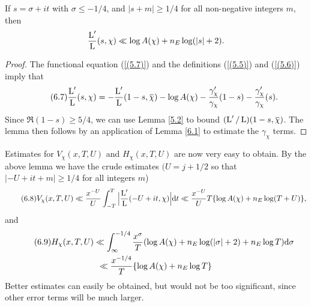 \documentclass[./main]{subfiles}
\begin{document}
\begin{lemma} \label{6.2}
If $s = \sigma + it$ with $\sigma \leq -1/4$, and $|s+m| \geq 1/4$ for all non-negative integers $m$, then 
\[\frac{\operatorname{L}'}{\operatorname{L}}(s, \chi) \ll \log A(\chi) + n_E \log(|s| + 2).
\]
\end{lemma}
\begin{proof}
The functional equation (\ref{(5.7)}) and the definitions (\ref{(5.5)}) and (\ref{(5.6)}) imply that
\[\tag{6.7}\label{(6.7)}\frac{\L'}{\L}(s, \chi) = -\frac{\L'}{\L}(1-s, \xoverline{\chi}) - \log A(\chi) - \frac{\gamma'_{\chi}}{\gamma_{\chi}} (1-s) - \frac{\gamma'_{\chi}}{\gamma_{\chi}}(s).
\]
Since $\Re(1-s) \geq 5/4$, we can use Lemma \ref{5.2} to bound $(\L'/\L)(1-s, \xoverline{\chi})$. The lemma then follows by an application of Lemma \ref{6.1} to estimate the $\gamma_{\chi}$ terms.
\end{proof}
Estimates for $V_{\chi}(x,T,U)$ and $H_{\chi}(x,T,U)$ are now very easy to obtain. By the above lemma we have the crude estimates $(U = j + 1/2$ so that $|-U + it+m| \geq 1/4$ for all integers $m$)
\[\tag{6.8}\label{(6.8)}  V_{\chi}(x,T,U) \ll \frac{x^{-U}}{U} \int_{-T}^{T} \Big| \frac{\operatorname{L}'}{\operatorname{L}}(-U+it, \chi) \Big| \mathrm{d}{t} \ll \frac{x^{-U}}{U} T\{\log A(\chi) + n_E \log(T+U)\},
\]
and 
\begin{multline}\tag{6.9}\label{(6.9)}
H_{\chi}(x,T,U) \ll \int_{\infty}^{-1/4} \frac{x^{\sigma}}{T}(\log A(\chi) + n_E \log(|\sigma| + 2) + n_E \log T ) \mathrm{d}{\sigma}\\
\ll \frac{x^{-1/4}}{T} \{\log A(\chi) + n_E \log T\}
\end{multline}
Better estimates can easily be obtained, but would not be too significant, since other error terms will be much larger.
\end{document}
